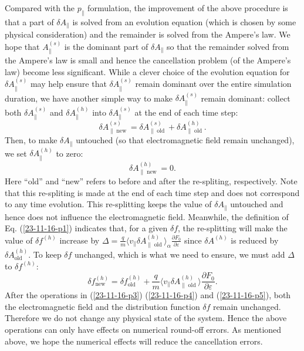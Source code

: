 \documentclass{llncs}
\newcommand{\nobracket}{}
\newcommand{\tmop}[1]{\ensuremath{\operatorname{#1}}}
\begin{document}
Compared with the $p_{\parallel}$ formulation, the improvement of the above
procedure is that a part of $\delta A_{\parallel}$ is solved from an evolution
equation (which is chosen by some physical consideration) and the remainder is
solved from the Ampere's law. We hope that $A_{\parallel}^{(s)}$ is the
dominant part of $\delta A_{\parallel}$ so that the remainder solved from the
Ampere's law is small and hence the cancellation problem (of the Ampere's law)
become less significant. While a clever choice of the evolution equation for
$\delta A_{\parallel}^{(s)}$ may help ensure that $\delta A_{\parallel}^{(s)}$
remain dominant over the entire simulation duration, we have another simple
way to make $\delta A_{\parallel}^{(s)}$ remain dominant: collect both $\delta
A_{\parallel}^{(s)}$ and $\delta A_{\parallel}^{(h)}$ into $\delta
A_{\parallel}^{(s)}$ at the end of each time step:
\begin{equation}
  \label{23-11-16-p3} \delta A_{\| \nobracket \tmop{new}}^{(s)} = \delta A_{\|
  \nobracket \tmop{old}}^{(s)} + \delta A_{\| \nobracket \tmop{old}}^{(h)} .
\end{equation}
Then, to make $\delta A_{\parallel}$ untouched (so that electromagnetic field
remain unchanged), we set $\delta A_{\parallel}^{(h)}$ to zero:
\begin{equation}
  \label{23-11-16-p4} \delta A_{\| \nobracket \tmop{new}}^{(h)} = 0.
\end{equation}
Here ``old'' and ``new'' refers to before and after the re-spliting,
respectively. Note that this re-spliting is made at the end of each time step
and does not correspond to any time evolution. This re-splitting keeps the
value of $\delta A_{\| \nobracket}$ untouched and hence does not influence the
electromagnetic field. Meanwhile, the definition of Eq. (\ref{23-11-16-p1})
indicates that, for a given $\delta f$, the re-splitting will make the value
of $\delta f^{(h)}$ increase by $\Delta = \frac{q}{m} \langle v_{\parallel}
\delta A_{\parallel \tmop{old}}^{(h)} \rangle_{\alpha} \frac{\partial
F_0}{\partial \varepsilon}$ since $\delta A^{(h)}$ is reduced by $\delta
A^{(h)}_{\tmop{old}}$. To keep $\delta f$ unchanged, which is what we need to
ensure, we must add $\Delta$ to $\delta f^{(h)}$:
\begin{equation}
  \label{23-11-16-p5} \delta f^{(h)}_{\tmop{new}} = \delta
  f^{(h)}_{\tmop{old}} + \frac{q}{m} \langle v_{\parallel} \delta A_{\parallel
  \tmop{old}}^{(h)} \rangle \frac{\partial F_0}{\partial \varepsilon} .
\end{equation}
After the operations in (\ref{23-11-16-p3}) (\ref{23-11-16-p4}) and
(\ref{23-11-16-p5}), both the electromagnetic field and the distribution
function $\delta f$ remain unchanged. Therefore we do not change any physical
state of the system. Hence the above operations can only have effects on
numerical round-off errors. As mentioned above, we hope the numerical effects
will reduce the cancellation errors.
\end{document}
